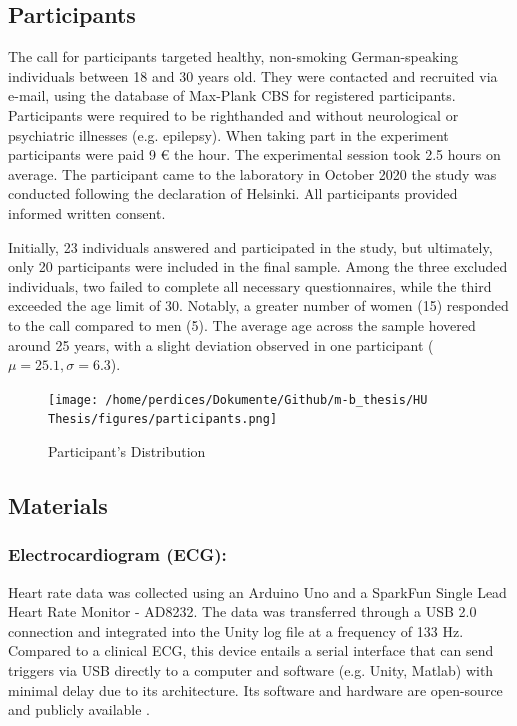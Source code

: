 \documentclass[12pt,oneside,openright]{report}
\begin{document}
\subsection*{Participants}
The call for participants targeted healthy, non-smoking German-speaking individuals between 18 and 30 years old. They were contacted and recruited via e-mail, using the database of Max-Plank CBS for registered participants. Participants were required to be righthanded and without neurological or psychiatric illnesses (e.g. epilepsy). When taking part in the experiment participants were paid 9 € the hour. The experimental session took 2.5 hours on average. The participant came to the laboratory in October 2020 the study was conducted following the declaration of Helsinki. All participants provided informed written consent. 

Initially, 23 individuals answered and participated in the study, but ultimately, only 20 participants were included in the final sample. Among the three excluded individuals, two failed to complete all necessary questionnaires, while the third exceeded the age limit of 30. Notably, a greater number of women (15) responded to the call compared to men (5). The average age across the sample hovered around 25 years, with a slight deviation observed in one participant ($\mu=25.1, \sigma=6.3$).

\begin{figure}[h]
    \centering
    \texttt{[image: /home/perdices/Dokumente/Github/m-b\_thesis/HU Thesis/figures/participants.png]}
    \caption{Participant's Distribution}
    \label{fig:mesh1}
\end{figure}

    
\subsection*{Materials}

\subsubsection*{Electrocardiogram (ECG):}
Heart rate data was collected using an Arduino Uno and a SparkFun Single Lead Heart Rate Monitor - AD8232. The data was transferred through a USB 2.0 connection and integrated into the Unity log file at a frequency of 133 Hz. Compared to a clinical ECG, this device entails a serial interface that can send triggers via USB directly to a computer and software (e.g. Unity, Matlab) with minimal delay due to its architecture. Its software and hardware are open-source and publicly available \parencite{TimsECG}.
\end{document}
